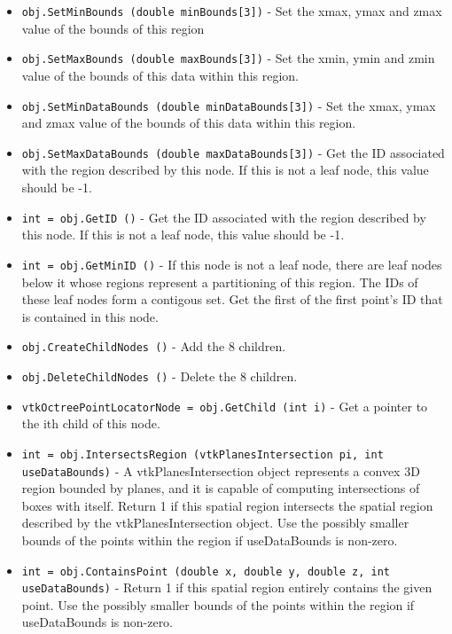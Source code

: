 \begin{itemize}
\item  \verb|obj.SetMinBounds (double minBounds[3])| -    Set the xmax, ymax and zmax value of the bounds of this region

\item  \verb|obj.SetMaxBounds (double maxBounds[3])| -    Set the xmin, ymin and zmin value of the bounds of this 
   data within this region.

\item  \verb|obj.SetMinDataBounds (double minDataBounds[3])| -    Set the xmax, ymax and zmax value of the bounds of this 
   data within this region.

\item  \verb|obj.SetMaxDataBounds (double maxDataBounds[3])| -    Get the ID associated with the region described by this node.  If
   this is not a leaf node, this value should be -1.

\item  \verb|int = obj.GetID ()| -    Get the ID associated with the region described by this node.  If
   this is not a leaf node, this value should be -1.

\item  \verb|int = obj.GetMinID ()| -    If this node is not a leaf node, there are leaf nodes below it whose
   regions represent a partitioning of this region.  The IDs of these
   leaf nodes form a contigous set.  Get the first of the first point's
   ID that is contained in this node.  

\item  \verb|obj.CreateChildNodes ()| -    Add the 8 children.

\item  \verb|obj.DeleteChildNodes ()| -    Delete the 8 children.

\item  \verb|vtkOctreePointLocatorNode = obj.GetChild (int i)| -    Get a pointer to the ith child of this node.

\item  \verb|int = obj.IntersectsRegion (vtkPlanesIntersection pi, int useDataBounds)| -    A vtkPlanesIntersection object represents a convex 3D region bounded
   by planes, and it is capable of computing intersections of
   boxes with itself.  Return 1 if this spatial region intersects
   the spatial region described by the vtkPlanesIntersection object.
   Use the possibly smaller bounds of the points within the region 
   if useDataBounds is non-zero.

\item  \verb|int = obj.ContainsPoint (double x, double y, double z, int useDataBounds)| -    Return 1 if this spatial region entirely contains the given point.
   Use the possibly smaller bounds of the points within the region 
   if useDataBounds is non-zero.


\end{itemize}
